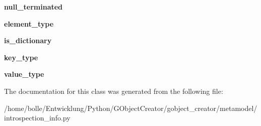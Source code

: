 \begin{DoxyCompactItemize}
\item 
\hypertarget{classgobject__creator_1_1metamodel_1_1introspection__info_1_1IntrospectionInfo_a6e5d9d2da73c2b8f06a229fd910698af}{
{\bfseries null\_\-terminated}}
\label{classgobject__creator_1_1metamodel_1_1introspection__info_1_1IntrospectionInfo_a6e5d9d2da73c2b8f06a229fd910698af}

\item 
\hypertarget{classgobject__creator_1_1metamodel_1_1introspection__info_1_1IntrospectionInfo_a44d0540141931cdce16ae1e5a58cf261}{
{\bfseries element\_\-type}}
\label{classgobject__creator_1_1metamodel_1_1introspection__info_1_1IntrospectionInfo_a44d0540141931cdce16ae1e5a58cf261}

\item 
\hypertarget{classgobject__creator_1_1metamodel_1_1introspection__info_1_1IntrospectionInfo_aa5fd0c3de0173ba3c2ce60fa6f831c6e}{
{\bfseries is\_\-dictionary}}
\label{classgobject__creator_1_1metamodel_1_1introspection__info_1_1IntrospectionInfo_aa5fd0c3de0173ba3c2ce60fa6f831c6e}

\item 
\hypertarget{classgobject__creator_1_1metamodel_1_1introspection__info_1_1IntrospectionInfo_ac814e923897c388643b107b194b86253}{
{\bfseries key\_\-type}}
\label{classgobject__creator_1_1metamodel_1_1introspection__info_1_1IntrospectionInfo_ac814e923897c388643b107b194b86253}

\item 
\hypertarget{classgobject__creator_1_1metamodel_1_1introspection__info_1_1IntrospectionInfo_aeb11af816bdb36b704ee4bd643eec5c7}{
{\bfseries value\_\-type}}
\label{classgobject__creator_1_1metamodel_1_1introspection__info_1_1IntrospectionInfo_aeb11af816bdb36b704ee4bd643eec5c7}

\end{DoxyCompactItemize}


The documentation for this class was generated from the following file:\begin{DoxyCompactItemize}
\item 
/home/bolle/Entwicklung/Python/GObjectCreator/gobject\_\-creator/metamodel/introspection\_\-info.py\end{DoxyCompactItemize}
